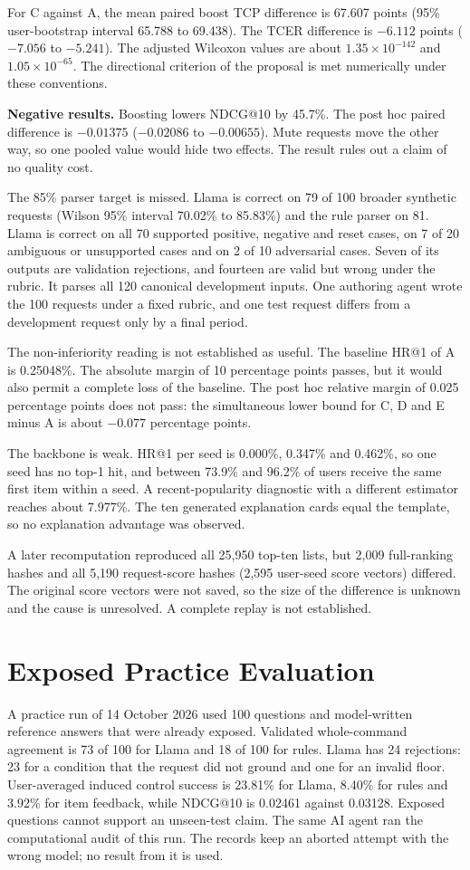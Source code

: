 \documentclass[conference]{IEEEtran}
\begin{document}
For C against A, the mean paired boost TCP difference is 67.607 points (95\% user-bootstrap interval 65.788 to 69.438). The TCER difference is $-6.112$ points ($-7.056$ to $-5.241$). The adjusted Wilcoxon values are about $1.35\times10^{-142}$ and $1.05\times10^{-65}$. The directional criterion of the proposal is met numerically under these conventions.

\textbf{Negative results.} Boosting lowers NDCG@10 by 45.7\%. The post hoc paired difference is $-0.01375$ ($-0.02086$ to $-0.00655$). Mute requests move the other way, so one pooled value would hide two effects. The result rules out a claim of no quality cost.

The 85\% parser target is missed. Llama is correct on 79 of 100 broader synthetic requests (Wilson 95\% interval 70.02\% to 85.83\%) and the rule parser on 81. Llama is correct on all 70 supported positive, negative and reset cases, on 7 of 20 ambiguous or unsupported cases and on 2 of 10 adversarial cases. Seven of its outputs are validation rejections, and fourteen are valid but wrong under the rubric. It parses all 120 canonical development inputs. One authoring agent wrote the 100 requests under a fixed rubric, and one test request differs from a development request only by a final period.

The non-inferiority reading is not established as useful. The baseline HR@1 of A is 0.25048\%. The absolute margin of 10 percentage points passes, but it would also permit a complete loss of the baseline. The post hoc relative margin of 0.025 percentage points does not pass: the simultaneous lower bound for C, D and E minus A is about $-0.077$ percentage points.

The backbone is weak. HR@1 per seed is 0.000\%, 0.347\% and 0.462\%, so one seed has no top-1 hit, and between 73.9\% and 96.2\% of users receive the same first item within a seed. A recent-popularity diagnostic with a different estimator reaches about 7.977\%. The ten generated explanation cards equal the template, so no explanation advantage was observed.

A later recomputation reproduced all 25,950 top-ten lists, but 2,009 full-ranking hashes and all 5,190 request-score hashes (2,595 user-seed score vectors) differed. The original score vectors were not saved, so the size of the difference is unknown and the cause is unresolved. A complete replay is not established.

\section{Exposed Practice Evaluation}
A practice run of 14 October 2026 used 100 questions and model-written reference answers that were already exposed. Validated whole-command agreement is 73 of 100 for Llama and 18 of 100 for rules. Llama has 24 rejections: 23 for a condition that the request did not ground and one for an invalid floor. User-averaged induced control success is 23.81\% for Llama, 8.40\% for rules and 3.92\% for item feedback, while NDCG@10 is 0.02461 against 0.03128. Exposed questions cannot support an unseen-test claim. The same AI agent ran the computational audit of this run. The records keep an aborted attempt with the wrong model; no result from it is used.
\end{document}
